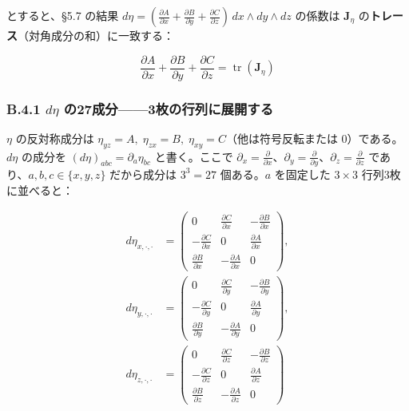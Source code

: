 \documentclass[a4paper,12pt,openany]{book}
\begin{document}
とすると、§5.7 の結果
\(d\eta = (\frac{\partial A}{\partial x} + \frac{\partial B}{\partial y} + \frac{\partial C}{\partial z})\,dx \wedge dy \wedge dz\)
の係数は \(\mathbf{J}_\eta\)
の\textbf{トレース}（対角成分の和）に一致する：

\[\frac{\partial A}{\partial x} + \frac{\partial B}{\partial y} + \frac{\partial C}{\partial z} = \operatorname{tr}(\mathbf{J}_\eta)\]

\hypertarget{b.4.1-deta-ux306e27ux6210ux52063ux679aux306eux884cux5217ux306bux5c55ux958bux3059ux308b}{%
\subsubsection*{\texorpdfstring{B.4.1 \(d\eta\)
の27成分——3枚の行列に展開する}{B.4.1 d\textbackslash eta の27成分——3枚の行列に展開する}}\label{b.4.1-deta-ux306e27ux6210ux52063ux679aux306eux884cux5217ux306bux5c55ux958bux3059ux308b}}

\(\eta\) の反対称成分は
\(\eta_{yz}=A,\; \eta_{zx}=B,\; \eta_{xy}=C\)（他は符号反転または
\(0\)）である。\(d\eta\) の成分を
\((d\eta)_{abc} = \partial_a \eta_{bc}\) と書く。ここで
\(\partial_x=\frac{\partial}{\partial x}\)、\(\partial_y=\frac{\partial}{\partial y}\)、\(\partial_z=\frac{\partial}{\partial z}\)
であり、\(a,b,c \in \{x,y,z\}\) だから成分は \(3^3=27\) 個ある。\(a\)
を固定した \(3 \times 3\) 行列3枚に並べると：

\[
\begin{aligned}
d\eta_{x,\cdot,\cdot}
&= \begin{pmatrix}
0 & \frac{\partial C}{\partial x} & -\frac{\partial B}{\partial x} \\
-\frac{\partial C}{\partial x} & 0 & \frac{\partial A}{\partial x} \\
\frac{\partial B}{\partial x} & -\frac{\partial A}{\partial x} & 0
\end{pmatrix}, \\
d\eta_{y,\cdot,\cdot}
&= \begin{pmatrix}
0 & \frac{\partial C}{\partial y} & -\frac{\partial B}{\partial y} \\
-\frac{\partial C}{\partial y} & 0 & \frac{\partial A}{\partial y} \\
\frac{\partial B}{\partial y} & -\frac{\partial A}{\partial y} & 0
\end{pmatrix}, \\
d\eta_{z,\cdot,\cdot}
&= \begin{pmatrix}
0 & \frac{\partial C}{\partial z} & -\frac{\partial B}{\partial z} \\
-\frac{\partial C}{\partial z} & 0 & \frac{\partial A}{\partial z} \\
\frac{\partial B}{\partial z} & -\frac{\partial A}{\partial z} & 0
\end{pmatrix}
\end{aligned}
\]
\end{document}

